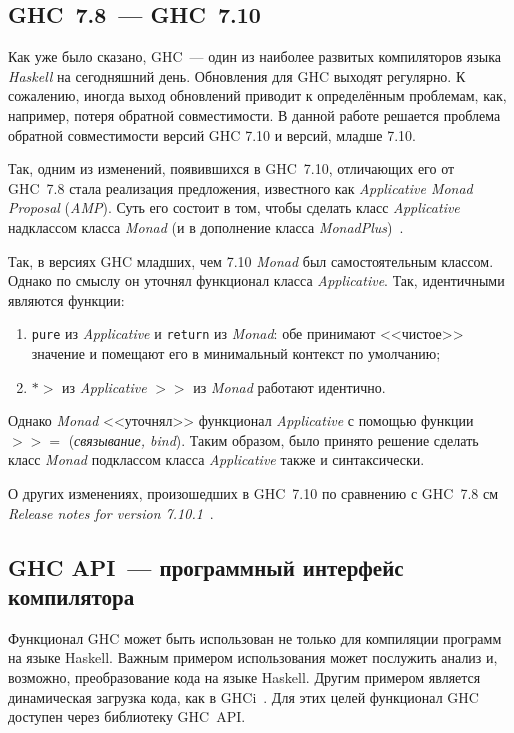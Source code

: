 \subsection{GHC~7.8~--- GHC~7.10}\label{710}
Как уже было сказано, GHC~--- один из наиболее развитых компиляторов языка \textit{Haskell} на сегодняшний день. Обновления для GHC выходят регулярно. К сожалению, иногда выход обновлений приводит к определённым проблемам, как, например, потеря обратной совместимости. В данной работе решается проблема обратной совместимости версий GHC 7.10 и версий, младше 7.10.

Так, одним из изменений, появившихся в GHC~7.10, отличающих его от GHC~7.8 стала реализация предложения, известного как \textit{Applicative Monad Proposal} (\textit{AMP}). Суть его состоит в том, чтобы сделать класс \textit{Applicative} надклассом класса \textit{Monad} (и в дополнение класса \textit{MonadPlus})~\autocite{AMP}.

Так, в версиях GHC младших, чем 7.10 \textit{Monad} был самостоятельным классом. Однако по смыслу он уточнял функционал класса \textit{Applicative}. Так, идентичными являются функции:
\begin{enumerate}[1)]
\item \lstinline{pure} из \textit{Applicative} и \lstinline{return} из \textit{Monad}: обе принимают <<чистое>> значение и помещают его в минимальный контекст по умолчанию;
\item \textbf{$*>$} из \textit{Applicative} \textbf{$>>$} из \textit{Monad} работают идентично.
\end{enumerate}
Однако \textit{Monad} <<уточнял>> функционал \textit{Applicative} с помощью функции \textbf{$>>=$} (\textit{связывание, bind}). Таким образом, было принято решение сделать класс \textit{Monad} подклассом класса \textit{Applicative} также и синтаксически.

О других изменениях, произошедших в GHC~7.10 по сравнению с GHC~7.8 см \textit{Release notes for version 7.10.1}~\autocite{release}.


\subsection{GHC API~--- программный интерфейс компилятора}\label{ghcapi}
Функционал GHC может быть использован не только для компиляции программ на языке Haskell. Важным примером использования может послужить анализ и, возможно, преобразование кода на языке Haskell. Другим примером является динамическая загрузка кода, как в GHCi~\autocite{GHClib}. Для этих целей функционал GHC доступен через библиотеку GHC~API.

